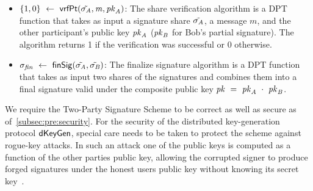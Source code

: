 \begin{definition}
\begin{itemize}
        \item $\{1,0\} ~\leftarrow~ \mathsf{vrfPt}(\tilde{\sigma_{\mathit{A}}}, \mathit{m}, \mathit{pk}_{\mathit{A}})$: The share verification algorithm is a DPT function that takes as input a signature share $\tilde{\sigma_{\mathit{A}}}$, a message $m$, and the other participant's public key $\mathit{pk}_{\mathit{A}}$ ($\mathit{pk}_{\mathit{B}}$ for Bob's partial signature).
        The algorithm returns 1 if the verification was successful or 0 otherwise.

        \item $\sigma_{\mathit{fin}} ~\leftarrow~ \mathsf{finSig}(\tilde{\sigma_{\mathit{A}}}, \tilde{\sigma_{\mathit{B}}})$: The finalize signature algorithm is a DPT function that takes as input two shares of the signatures and combines them into a final signature valid under the composite public key $\mathit{pk} ~=~ \mathit{pk}_{\mathit{A}} ~\cdot~ \mathit{pk}_{\mathit{B}}$.

    \end{itemize}

\end{definition}

We require the Two-Party Signature Scheme to be correct as well as secure as of~\cref{subsec:pre:security}.
For the security of the distributed key-generation protocol $\mathsf{dKeyGen}$, special care needs to be taken to protect the scheme against rogue-key attacks.
In such an attack one of the public keys is computed as a function of the other parties public key, allowing the corrupted signer to produce forged signatures under the honest users public key without knowing its secret key~\cite{maxwell2019simple}.


